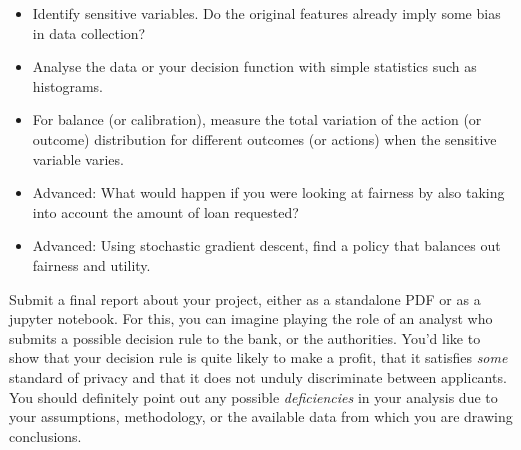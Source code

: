  \begin{itemize}
 \item Identify sensitive variables. Do the original features already imply some bias in data collection?
 \item Analyse the data or your decision function with simple statistics such as histograms.
 \item For balance (or calibration), measure the total variation of the action (or outcome) distribution for different outcomes (or actions) when the sensitive variable varies.
 \item Advanced: What would happen if you were looking at fairness by also taking into account the amount of loan requested?
 \item Advanced: Using stochastic gradient descent, find a policy that balances out fairness and utility.
 \end{itemize}

Submit a final report about your project, either as a standalone PDF or as a jupyter notebook. For this, you can imagine playing the role of an analyst who submits a possible decision rule to the bank, or the authorities. You'd like to show that your decision rule is quite likely to make a profit, that it satisfies \emph{some} standard of privacy and that it does not unduly discriminate between applicants. You should definitely point out any possible \emph{deficiencies} in your analysis due to your assumptions, methodology, or the available data from which you are drawing conclusions.

